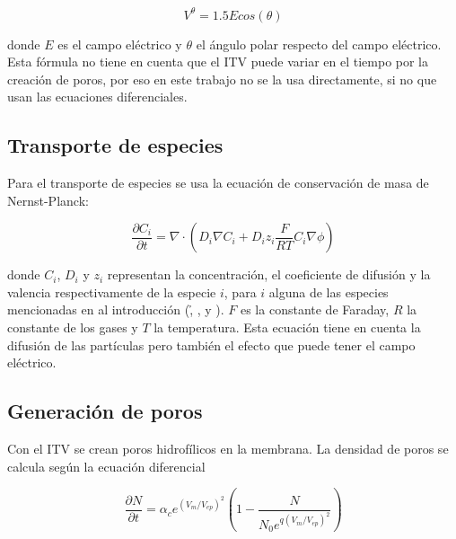 \documentclass[a4paper,10pt]{article}
\begin{document}
\begin{equation} \label{eq:cos}
	V^{\theta} = 1.5 E cos (\theta)
\end{equation}

donde $E$ es el campo eléctrico y $\theta$ el ángulo polar respecto del campo eléctrico. Esta fórmula no tiene en cuenta que el ITV puede variar en el tiempo por la creación de poros, por eso en este trabajo no se la usa directamente, si no que usan las ecuaciones diferenciales. 

\subsection{Transporte de especies}
Para el transporte de especies se usa la ecuación de conservación de masa de Nernst-Planck:

\begin{equation} \label{eq:trans}
	\frac{\partial C_i}{\partial t} = \nabla \cdot \left( D_i \nabla C_i + D_i z_i \frac{F}{R T} C_i \nabla \phi \right)
\end{equation}

donde $C_i$, $D_i$ y $z_i$ representan la concentración, el coeficiente de difusión y la valencia 
respectivamente de la especie $i$, para $i$ alguna de las especies mencionadas en al introducción
(\h, \oh, \na y \cl).
$F$ es la constante de Faraday, $R$ la constante de los gases y $T$ la temperatura. 
Esta ecuación tiene en cuenta la difusión de las partículas pero también el efecto que puede tener el campo eléctrico.\\



\subsection{Generación de poros}
Con el ITV se crean poros hidrofílicos en la membrana. La densidad de poros se calcula según la ecuación diferencial  

\begin{equation} \label{eq:poros-crea}
	\frac{\partial N}{\partial t} = \alpha_c e^{(V_m/V_{ep})^2} \left( 1 - \frac{N}{N_0 e^{q \left(V_m/V_{ep} \right) ^2}} \right)
\end{equation}
\end{document}
